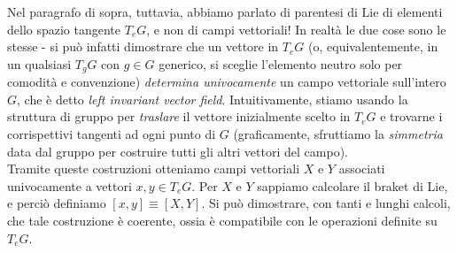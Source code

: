 \documentclass[../../FisicaTeorica.tex]{subfiles}
\begin{document}
\begin{expl}
Nel paragrafo di sopra, tuttavia, abbiamo parlato di parentesi di Lie di elementi dello spazio tangente $T_e G$, e non di campi vettoriali! In realtà le due cose sono le stesse - si può infatti dimostrare che un vettore in $T_eG$ (o, equivalentemente, in un qualsiasi $T_g G$ con $g\in G$ generico, si sceglie l'elemento neutro solo per comodità e convenzione) \textit{determina univocamente} un campo vettoriale sull'intero $G$, che è detto \textit{left invariant vector field}. Intuitivamente, stiamo usando la struttura di gruppo per \textit{traslare} il vettore inizialmente scelto in $T_eG$ e trovarne i corrispettivi tangenti ad ogni punto di $G$ (graficamente, sfruttiamo la \textit{simmetria} data dal gruppo per costruire tutti gli altri vettori del campo).\\
Tramite queste costruzioni otteniamo campi vettoriali $X$ e $Y$ associati univocamente a vettori $x,y \in T_eG$. Per $X$ e $Y$ sappiamo calcolare il braket di Lie, e perciò definiamo $[x,y] \equiv [X,Y]$. Si può dimostrare, con tanti e lunghi calcoli, che tale costruzione è coerente, ossia è compatibile con le operazioni definite su $T_eG$.\\


\end{expl}
\end{document}
